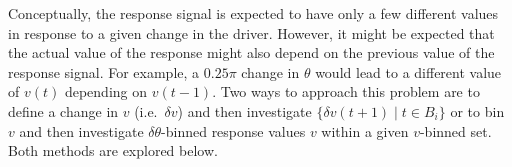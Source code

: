 \documentclass[a4paper,11pt]{article}
\begin{document}
Conceptually, the response signal is expected to have only a few different values in response to a given change in the driver.  However, it might be expected that the actual value of the response might also depend on the previous value of the response signal.  For example, a $0.25\pi$ change in $\theta$ would lead to a different value of $v(t)$ depending on $v(t-1)$.  Two ways to approach this problem are to define a change in $v$ (i.e.\ $\delta v$) and then investigate $\{\delta v(t+1)\;|\; t\in B_i\}$ or to bin $v$ and then investigate $\delta\theta$-binned response values $v$ within a given $v$-binned set.  Both methods are explored below.
\end{document}
